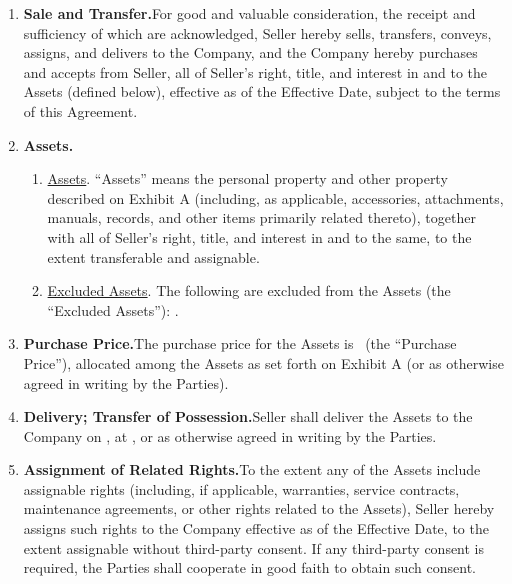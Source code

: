\begin{enumerate}[leftmargin=*, label=\arabic*.]
	\item \textbf{Sale and Transfer.}\enspace For good and valuable consideration, the receipt
	and sufficiency of which are acknowledged, Seller hereby sells, transfers, conveys, assigns,
	and delivers to the Company, and the Company hereby purchases and accepts from Seller, all of
	Seller's right, title, and interest in and to the Assets (defined below), effective as of the
	Effective Date, subject to the terms of this Agreement.

	\item \textbf{Assets.}
	\begin{enumerate}[leftmargin=*, label=\arabic{enumi}.\arabic*]
		\item \uline{Assets}. ``Assets'' means the personal property and other property described
		on Exhibit A (including, as applicable, accessories, attachments, manuals, records, and
		other items primarily related thereto), together with all of Seller's right, title, and
		interest in and to the same, to the extent transferable and assignable.

		\item \uline{Excluded Assets}. The following are excluded from the Assets (the ``Excluded
		Assets''): \excludedAssets.
	\end{enumerate}

	\item \textbf{Purchase Price.}\enspace The purchase price for the Assets is \purchasePrice\
	(the ``Purchase Price''), allocated among the Assets as set forth on Exhibit A (or as
	otherwise agreed in writing by the Parties).

	\item \textbf{Delivery; Transfer of Possession.}\enspace Seller shall deliver the Assets to
	the Company on \deliveryDate, at \deliveryPlace, or as otherwise agreed in writing by the
	Parties.

	\item \textbf{Assignment of Related Rights.}\enspace To the extent any of the Assets include
	assignable rights (including, if applicable, warranties, service contracts, maintenance
	agreements, or other rights related to the Assets), Seller hereby assigns such rights to the
	Company effective as of the Effective Date, to the extent assignable without third-party
	consent. If any third-party consent is required, the Parties shall cooperate in good faith to
	obtain such consent.


\end{enumerate}
